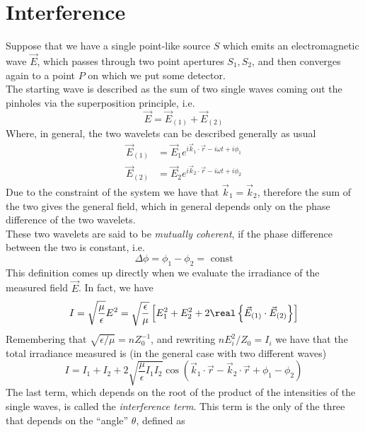 \documentclass[../electromagnetism.tex]{subfiles}
\begin{document}
\section{Interference}
Suppose that we have a single point-like source $S$ which emits an electromagnetic wave $\vec{E}$, which passes through two point apertures $S_1, S_2$, and then converges again to a point $P$ on which we put some detector.\\
The starting wave is described as the sum of two single waves coming out the pinholes via the superposition principle, i.e.
\begin{equation*}
	\vec{E}=\vec{E}_{(1)}+\vec{E}_{(2)}
\end{equation*}
Where, in general, the two wavelets can be described generally as usual
\begin{equation}
	\begin{aligned}
		\vec{E}_{(1)}&= \vec{E}_1e^{i\vec{k}_1\cdot\vec{r}-i\omega t+i\phi_1}\\
		\vec{E}_{(2)}&= \vec{E}_2e^{i\vec{k}_2\cdot\vec{r}-i\omega t+i\phi_2}
	\end{aligned}
	\label{eq:afterpin.int}
\end{equation}
Due to the constraint of the system we have that $\vec{k}_1=\vec{k}_2$, therefore the sum of the two gives the general field, which in general depends only on the phase difference of the two wavelets.\\
These two wavelets are said to be \textit{mutually coherent}, if the phase difference between the two is constant, i.e.
\begin{equation}
	\Delta\phi=\phi_1-\phi_2=\text{ const}
	\label{eq:coherencedef.int}
\end{equation}
This definition comes up directly when we evaluate the irradiance of the measured field $\vec{E}$. In fact, we have
\begin{equation*}
	I=\sqrt{\frac{\mu}{\epsilon}}E^2=\sqrt{\frac{\epsilon}{\mu}}\left[ E_1^2+E_2^2+2\real\left\{ \vec{E}_{(1)}\cdot\vec{E}_{(2)} \right\} \right]
\end{equation*}
Remembering that $\sqrt{\epsilon/\mu}=nZ_0^{-1}$, and rewriting $nE_i^2/Z_0=I_i$ we have that the total irradiance measured is (in the general case with two different waves)
\begin{equation}
	I=I_1+I_2+2\sqrt{\frac{\mu}{\epsilon}I_1I_2}\cos\left( \vec{k}_1\cdot\vec{r}-\vec{k}_2\cdot\vec{r}+\phi_1-\phi_2 \right)
	\label{eq:intwavesI.int}
\end{equation}
The last term, which depends on the root of the product of the intensities of the single waves, is called the \textit{interference term}. This term is the only of the three that depends on the ``angle'' $\theta$, defined as
\end{document}
